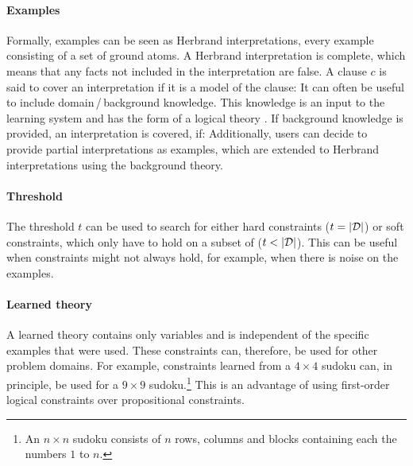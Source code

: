 \paragraph{Examples}
Formally, examples can be seen as Herbrand interpretations, every example consisting of a set of ground atoms.
A Herbrand interpretation is complete, which means that any facts not included in the interpretation are false.
A clause $c$ is said to cover an interpretation  if it is a model of the clause: 
It can often be useful to include domain\,/\,background knowledge.
This knowledge is an input to the learning system and has the form of a logical theory .
If background knowledge is provided, an interpretation  is covered, if: 
Additionally, users can decide to provide partial interpretations as examples, which are extended to Herbrand interpretations using the background theory.

\paragraph{Threshold}
The threshold $t$ can be used to search for either hard constraints ($t = |\mathcal{D}|$) or soft constraints, which only have to hold on a subset of  ($t < |\mathcal{D}|$).
This can be useful when constraints might not always hold, for example, when there is noise on the examples.

\paragraph{Learned theory}
A learned theory  contains only variables and is independent of the specific examples that were used.
These constraints can, therefore, be used for other problem domains.
For example, constraints learned from a $4 \times 4$ sudoku can, in principle, be used for a $9 \times 9$ sudoku.\footnote{An $n \times n$ sudoku consists of $n$ rows, columns and blocks containing each the numbers $1$ to $n$.}
This is an advantage of using first-order logical constraints over propositional constraints.


